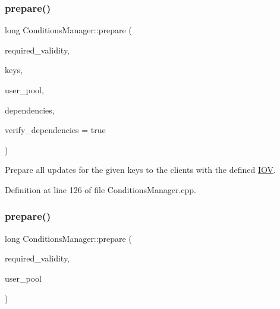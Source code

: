 \subsubsection{\texorpdfstring{prepare()}{prepare()}\hspace{0.1cm}{\footnotesize\ttfamily [2/4]}}
{\footnotesize\ttfamily long Conditions\+Manager\+::prepare (\begin{DoxyParamCaption}\item[{const \hyperlink{class_d_d4hep_1_1_i_o_v}{I\+OV} \&}]{required\+\_\+validity,  }\item[{const \hyperlink{class_d_d4hep_1_1_conditions_1_1_conditions_manager_a8dd76f9acef2c8d3b7970e266fe7eff6}{Condition\+Keys} \&}]{keys,  }\item[{\hyperlink{class_d_d4hep_1_1dd4hep__ptr}{dd4hep\+\_\+ptr}$<$ \hyperlink{class_d_d4hep_1_1_conditions_1_1_user_pool}{User\+Pool} $>$ \&}]{user\+\_\+pool,  }\item[{const \hyperlink{class_d_d4hep_1_1_conditions_1_1_conditions_manager_aab778cfbe096ae8ad20a0bdbb047ad32}{Dependencies} \&}]{dependencies,  }\item[{bool}]{verify\+\_\+dependencies = {\ttfamily true} }\end{DoxyParamCaption})}



Prepare all updates for the given keys to the clients with the defined \hyperlink{class_d_d4hep_1_1_i_o_v}{I\+OV}. 



Definition at line 126 of file Conditions\+Manager.\+cpp.

\hypertarget{class_d_d4hep_1_1_conditions_1_1_conditions_manager_a16a1aa58d0a9d61d9bed50b16705a63e}{}\label{class_d_d4hep_1_1_conditions_1_1_conditions_manager_a16a1aa58d0a9d61d9bed50b16705a63e} 
\subsubsection{\texorpdfstring{prepare()}{prepare()}\hspace{0.1cm}{\footnotesize\ttfamily [3/4]}}
{\footnotesize\ttfamily long Conditions\+Manager\+::prepare (\begin{DoxyParamCaption}\item[{const \hyperlink{class_d_d4hep_1_1_i_o_v}{I\+OV} \&}]{required\+\_\+validity,  }\item[{\hyperlink{class_d_d4hep_1_1dd4hep__ptr}{dd4hep\+\_\+ptr}$<$ \hyperlink{class_d_d4hep_1_1_conditions_1_1_user_pool}{User\+Pool} $>$ \&}]{user\+\_\+pool }\end{DoxyParamCaption})}



